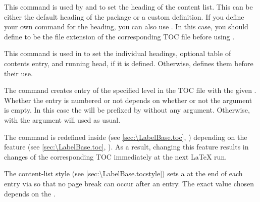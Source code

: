 \begin{Declaration}
\end{Declaration}
This command is used by  and
 to set the heading of the content list.
This can be either the default heading of the  package or a
custom definition. If you define your own command for the heading, you can
also use . In this case, you should define
 to be the file
extension of the corresponding TOC file before using
.%
\EndIndexGroup


\begin{Declaration}
\end{Declaration}
This command is used in  to set the
individual headings, optional table of contents entry, and running head, if it
is defined. Otherwise,  defines them
before their use.%
\EndIndexGroup


\begin{Declaration}
\end{Declaration}
The 
command creates entry of the specified level in the TOC file with the given
. Whether the entry is numbered or not depends on whether or
not the  argument is empty. In this case the  will
be prefixed by  without any argument. Otherwise,
 with the  argument will used
as usual.

The  command is redefined inside
 (see \autoref{sec:\LabelBase.toc},
) depending on the 
feature (see \autoref{sec:\LabelBase.toc},
). As a result, changing this feature
results in changes of the corresponding TOC immediately at the next \LaTeX{}
run.%
\EndIndexGroup


\begin{Declaration}
\end{Declaration}
The 
content-list style (see \autoref{sec:\LabelBase.tocstyle}) sets a
 at the end of each entry via
 so that no page break can occur after an
entry. The exact value chosen depends on the .

